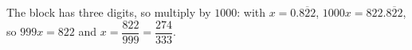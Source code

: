 The block has three digits, so multiply by $1000$: with $x=0.\overline{822}$, $1000x=822.\overline{822}$, so $999x=822$ and $x=\dfrac{822}{999}=\boxed{\dfrac{274}{333}}$.
